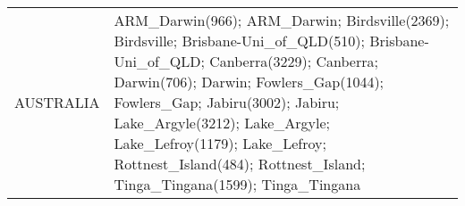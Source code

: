\documentclass[journal abbreviation, manuscript]{copernicus}
\begin{document}
\begin{table}
\begin{tabularx}{\textwidth}{lX}
                                                                                                                                                                                                                                                                                                                                                                                                                                                                                                                                                                                                                                 \\
  AUSTRALIA & ARM\_Darwin(966); ARM\_Darwin; Birdsville(2369); Birdsville; Brisbane-Uni\_of\_QLD(510); Brisbane-Uni\_of\_QLD; Canberra(3229); Canberra; Darwin(706); Darwin; Fowlers\_Gap(1044); Fowlers\_Gap; Jabiru(3002); Jabiru; Lake\_Argyle(3212); Lake\_Argyle; Lake\_Lefroy(1179); Lake\_Lefroy; Rottnest\_Island(484); Rottnest\_Island; Tinga\_Tingana(1599); Tinga\_Tingana                                                                                                                                                                                                                                                                                                                                                                                                                                                                                                                                                                                                                                                                                                                                                                                                                                                                                                                                                                                                                                                                                                                                                                                                                                                                                                                                                                                                                                                                                                                                                                                                                                                                                                                                                                                                                                                                                                                                                                                                                                                                                                                                                                                                                                                                                                                               
\end{tabularx}
\end{table}
\end{document}
